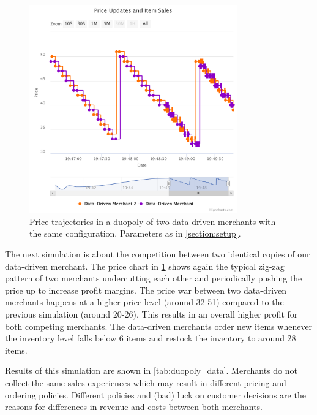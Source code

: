 \begin{figure}[t]
	\centering
	\includegraphics[width=0.8\textwidth]{figures/duopoly_data_prices}
	\caption[Price Trajectories: Data-Driven Merchant versus Data-Driven Merchant]{Price trajectories in a duopoly of two data-driven merchants with the same configuration. Parameters as in \cref{section:setup}.}
	\label{fig:duopoly_data_prices}
\end{figure}

The next simulation is about the competition between two identical copies of our data-driven merchant.
The price chart in \cref{fig:duopoly_data_prices} shows again the typical zig-zag pattern of two merchants undercutting each other and periodically pushing the price up to increase profit margins.
The price war between two data-driven merchants happens at a higher price level (around 32-51) compared to the previous simulation (around 20-26).
This results in an overall higher profit for both competing merchants.
The data-driven merchants order new items whenever the inventory level falls below 6 items and restock the inventory to around 28 items.

Results of this simulation are shown in \cref{tab:duopoly_data}.
Merchants do not collect the same sales experiences which may result in different pricing and ordering policies.
Different policies and (bad) luck on customer decisions are the reasons for differences in revenue and costs between both merchants.

